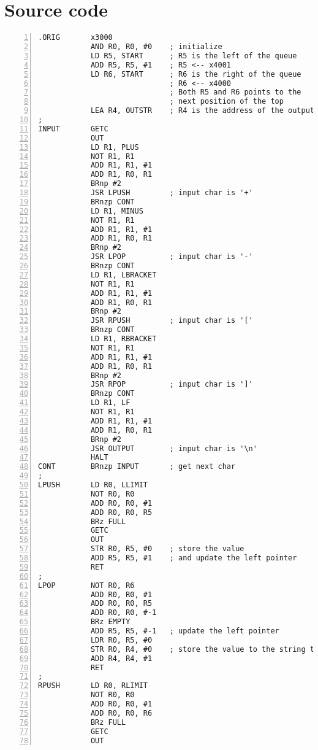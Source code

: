 \documentclass[a4paper, 12pt]{article}
\begin{document}
\section{Source code}
\linespread{0.8}      %
\begin{Verbatim}[frame = single, numbers = left, fontsize = \footnotesize]
.ORIG       x3000
            AND R0, R0, #0    ; initialize
            LD R5, START      ; R5 is the left of the queue
            ADD R5, R5, #1    ; R5 <-- x4001
            LD R6, START      ; R6 is the right of the queue
                              ; R6 <-- x4000
                              ; Both R5 and R6 points to the
                              ; next position of the top
            LEA R4, OUTSTR    ; R4 is the address of the output string
;
INPUT       GETC
            OUT
            LD R1, PLUS
            NOT R1, R1
            ADD R1, R1, #1
            ADD R1, R0, R1
            BRnp #2
            JSR LPUSH         ; input char is '+'
            BRnzp CONT
            LD R1, MINUS
            NOT R1, R1
            ADD R1, R1, #1
            ADD R1, R0, R1
            BRnp #2
            JSR LPOP          ; input char is '-'
            BRnzp CONT
            LD R1, LBRACKET
            NOT R1, R1
            ADD R1, R1, #1
            ADD R1, R0, R1
            BRnp #2
            JSR RPUSH         ; input char is '['
            BRnzp CONT
            LD R1, RBRACKET
            NOT R1, R1
            ADD R1, R1, #1
            ADD R1, R0, R1
            BRnp #2
            JSR RPOP          ; input char is ']'
            BRnzp CONT
            LD R1, LF
            NOT R1, R1
            ADD R1, R1, #1
            ADD R1, R0, R1
            BRnp #2
            JSR OUTPUT        ; input char is '\n'
            HALT
CONT        BRnzp INPUT       ; get next char
;
LPUSH       LD R0, LLIMIT
            NOT R0, R0
            ADD R0, R0, #1
            ADD R0, R0, R5
            BRz FULL
            GETC
            OUT
            STR R0, R5, #0    ; store the value
            ADD R5, R5, #1    ; and update the left pointer
            RET
;
LPOP        NOT R0, R6
            ADD R0, R0, #1
            ADD R0, R0, R5
            ADD R0, R0, #-1
            BRz EMPTY
            ADD R5, R5, #-1   ; update the left pointer
            LDR R0, R5, #0
            STR R0, R4, #0    ; store the value to the string to be output
            ADD R4, R4, #1
            RET
;
RPUSH       LD R0, RLIMIT
            NOT R0, R0
            ADD R0, R0, #1
            ADD R0, R0, R6
            BRz FULL
            GETC
            OUT

\end{Verbatim}
\end{document}
